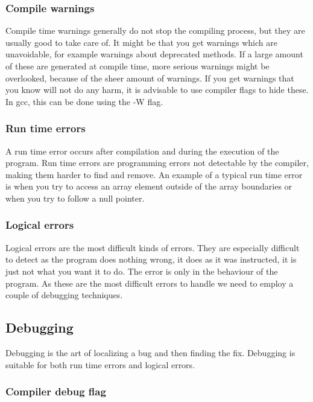 \documentclass[11pt,a4paper,twoside]{article}
\begin{document}
\subsubsection{Compile warnings}

Compile time warnings generally do not stop the compiling process, but they are
usually good to take care of. It might be that you get warnings which are
unavoidable, for example warnings about deprecated methods. If a large amount
of these are generated at compile time, more serious warnings might be
overlooked, because of the sheer amount of warnings. If you get warnings that
you know will not do any harm, it is advisable to use compiler flags to hide
these. In gcc, this can be done using the -W flag.

\subsubsection{Run time errors}

A run time error occurs after compilation and during the execution of the
program. Run time errors are programming errors not detectable by the compiler,
making them harder to find and remove. An example of a typical run time error
is when you try to access an array element outside of the array boundaries or
when you try to follow a null pointer.

\subsubsection{Logical errors}

Logical errors are the most difficult kinds of errors. They are especially
difficult to detect as the program does nothing wrong, it does as it was
instructed, it is just not what you want it to do. The error is only in the
behaviour of the program. As these are the most difficult errors to handle we
need to employ a couple of debugging techniques.

\subsection{Debugging}

Debugging is the art of localizing a bug and then finding the fix. Debugging is
suitable for both run time errors and logical errors. 

\subsubsection{Compiler debug flag}
\end{document}
